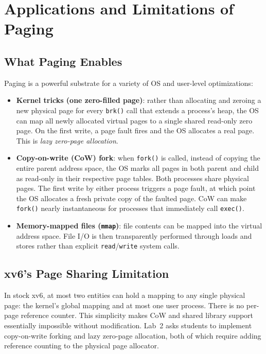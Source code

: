 \documentclass[11pt]{article}
\begin{document}
\section{Applications and Limitations of Paging}

\subsection{What Paging Enables}

Paging is a powerful substrate for a variety of OS and user-level optimizations:

\begin{itemize}
    \item \textbf{Kernel tricks (one zero-filled page)}: rather than allocating and zeroing a new physical page for every \texttt{brk()} call that extends a process's heap, the OS can map all newly allocated virtual pages to a single shared read-only zero page. On the first write, a page fault fires and the OS allocates a real page. This is \emph{lazy zero-page allocation}.
    \item \textbf{Copy-on-write (CoW) fork}: when \texttt{fork()} is called, instead of copying the entire parent address space, the OS marks all pages in both parent and child as read-only in their respective page tables. Both processes share physical pages. The first write by either process triggers a page fault, at which point the OS allocates a fresh private copy of the faulted page. CoW can make \texttt{fork()} nearly instantaneous for processes that immediately call \texttt{exec()}.
    \item \textbf{Memory-mapped files (\texttt{mmap})}: file contents can be mapped into the virtual address space. File I/O is then transparently performed through loads and stores rather than explicit \texttt{read}/\texttt{write} system calls.
\end{itemize}

\subsection{xv6's Page Sharing Limitation}

In stock xv6, at most two entities can hold a mapping to any single physical page: the kernel's global mapping and at most one user process. There is no per-page reference counter. This simplicity makes CoW and shared library support essentially impossible without modification. Lab~2 asks students to implement copy-on-write forking and lazy zero-page allocation, both of which require adding reference counting to the physical page allocator.
\end{document}
